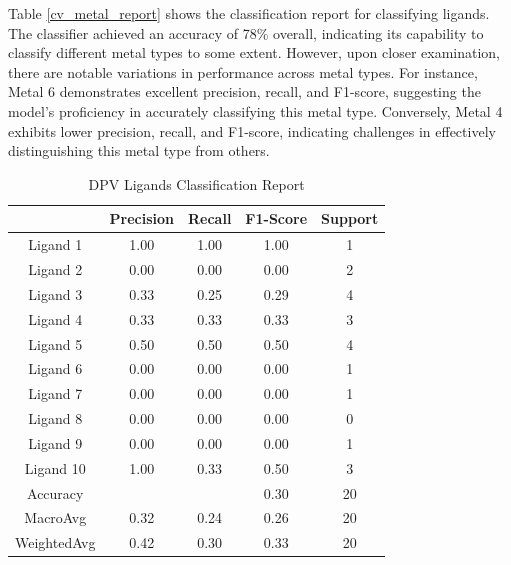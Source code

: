 Table \ref{cv_metal_report} shows the classification report for classifying ligands. The classifier achieved an accuracy of 78\% overall, indicating its capability to classify different metal types to some extent. However, upon closer examination, there are notable variations in performance across metal types. For instance, Metal 6 demonstrates excellent precision, recall, and F1-score, suggesting the model's proficiency in accurately classifying this metal type. Conversely, Metal 4 exhibits lower precision, recall, and F1-score, indicating challenges in effectively distinguishing this metal type from others.
\begin{table}[!h]
\begin{center}
\begin{tabular}{c|c|c|c|c}
 & Precision & Recall & F1-Score & Support\\
\hline
Ligand 1 & 1.00 & 1.00 & 1.00 & 1\\
Ligand 2 & 0.00 & 0.00 & 0.00 & 2\\
Ligand 3 & 0.33 & 0.25 & 0.29 & 4\\
Ligand 4 & 0.33 & 0.33 & 0.33 & 3\\
Ligand 5 & 0.50 & 0.50 & 0.50 & 4\\
Ligand 6 & 0.00 & 0.00 & 0.00 & 1\\
Ligand 7 & 0.00 & 0.00 & 0.00 & 1\\
Ligand 8 & 0.00 & 0.00 & 0.00 & 0\\
Ligand 9 & 0.00 & 0.00 & 0.00 & 1\\
Ligand 10 & 1.00 & 0.33 & 0.50 & 3\\
\hline
Accuracy & & & 0.30 & 20\\
MacroAvg & 0.32 & 0.24 & 0.26 & 20\\
WeightedAvg & 0.42 & 0.30 & 0.33 & 20
\end{tabular}
\caption{DPV Ligands Classification Report}
\label{dpv_ligand_report}
\end{center}
\end{table}
